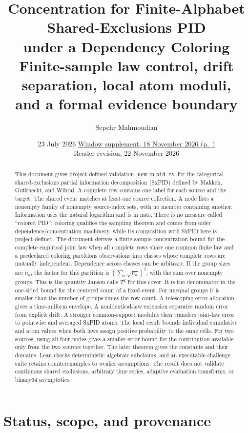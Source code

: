 \documentclass[11pt]{article}
\title{\PidReportTitle
  {Concentration for Finite-Alphabet Shared-Exclusions PID\\
   under a Dependency Coloring}
  {Finite-sample law control, drift separation, local atom moduli,\\
   and a formal evidence boundary}}
\author{Sepehr Mahmoudian}
\date{23 July 2026 \quad\textbullet\quad
  \hyperref[supp:windows]{Window supplement, 18 November 2026 (p.~\pageref*{supp:windows})}\\
  Reader revision, 22 November 2026}
\theoremstyle{definition}
\begin{document}
\PidMakeTitle

\begin{abstract}
This document gives project-defined validation, new in \texttt{pid-rs}, for the categorical
shared-exclusions partial information decomposition (SxPID) defined by Makkeh, Gutknecht, and
Wibral. A complete row contains one label for each source and the target. The shared event
matches at least one source collection. A node lists a nonempty family of nonempty source-index
sets, with no member containing another. Information uses the natural logarithm and is in nats.  There is no measure called ``colored PID'': coloring
qualifies the sampling theorem and comes from older dependence/concentration machinery, while its
composition with SxPID here is project-defined.  The document derives a finite-sample concentration bound
for the complete empirical joint law when all complete rows share one common finite law and a
predeclared coloring partitions observations into classes whose complete rows are mutually independent.
Dependence across classes can be arbitrary.  If the group sizes are $n_a$, the factor for this partition is
$(\sum_a\sqrt{n_a})^2$, with the sum over nonempty groups. This is the
quantity Janson calls $T^2$ for this cover. It is the denominator in the one-sided bound for
the centered count of a fixed event. For unequal groups it is smaller than the number of groups
times the row count.  A telescoping error allocation
gives a time-uniform envelope.  A nonidentical-law extension separates random error from explicit
drift.  A stronger common-support modulus then transfers joint-law error to pointwise and averaged
SxPID atoms.  The local result bounds individual cumulative and atom values when both
laws assign positive probability to the same cells. For two sources, using
all four nodes gives a smaller error bound for the contribution available
only from the two sources together. The later theorem gives the constants
and their domains.  Lean checks deterministic
algebraic subclaims, and an executable challenge suite retains
counterexamples to weaker assumptions.  The result does not validate continuous shared
exclusions, arbitrary time series, adaptive evaluation transforms, or binary64 asymptotics.
\end{abstract}

\begingroup
\small
\setlength{\parskip}{0pt}
\tableofcontents
\endgroup

\section{Status, scope, and provenance}
\end{document}
